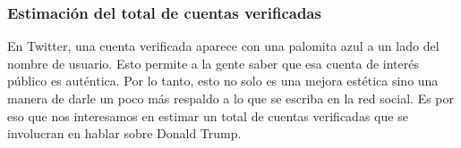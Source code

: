 \documentclass[
]{article}
\newenvironment{Shaded}{\begin{snugshade}}{\end{snugshade}}
\newcommand{\CommentTok}[1]{\textcolor[rgb]{0.56,0.35,0.01}{\textit{#1}}}
\newcommand{\DataTypeTok}[1]{\textcolor[rgb]{0.13,0.29,0.53}{#1}}
\newcommand{\DecValTok}[1]{\textcolor[rgb]{0.00,0.00,0.81}{#1}}
\newcommand{\KeywordTok}[1]{\textcolor[rgb]{0.13,0.29,0.53}{\textbf{#1}}}
\newcommand{\NormalTok}[1]{#1}
\newcommand{\OperatorTok}[1]{\textcolor[rgb]{0.81,0.36,0.00}{\textbf{#1}}}
\newcommand{\StringTok}[1]{\textcolor[rgb]{0.31,0.60,0.02}{#1}}
\begin{document}
\begin{Shaded}
\end{Shaded}

\hypertarget{estimaciuxf3n-del-total-de-cuentas-verificadas}{%
\subsubsection{Estimación del total de cuentas
verificadas}\label{estimaciuxf3n-del-total-de-cuentas-verificadas}}

En Twitter, una cuenta verificada aparece con una palomita azul a un
lado del nombre de usuario. Esto permite a la gente saber que esa cuenta
de interés público es auténtica. Por lo tanto, esto no solo es una
mejora estética sino una manera de darle un poco más respaldo a lo que
se escriba en la red social. Es por eso que nos interesamos en estimar
un total de cuentas verificadas que se involucran en hablar sobre Donald
Trump.
\end{document}
